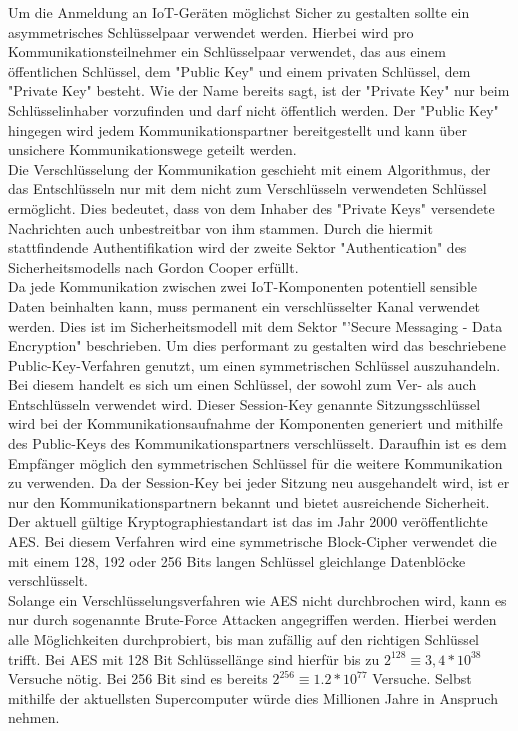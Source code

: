 Um die Anmeldung an \ac{IoT}-Geräten möglichst Sicher zu gestalten sollte ein asymmetrisches Schlüsselpaar verwendet werden. Hierbei wird pro Kommunikationsteilnehmer ein Schlüsselpaar verwendet, das aus einem öffentlichen Schlüssel, dem "Public Key" und einem privaten Schlüssel, dem "Private Key" besteht. Wie der Name bereits sagt, ist der "Private Key" nur beim Schlüsselinhaber vorzufinden und darf nicht öffentlich werden. Der "Public Key" hingegen wird jedem Kommunikationspartner bereitgestellt und kann über unsichere Kommunikationswege geteilt werden.\\

Die Verschlüsselung der Kommunikation geschieht mit einem Algorithmus, der das Entschlüsseln nur mit dem nicht zum Verschlüsseln verwendeten Schlüssel ermöglicht. Dies bedeutet, dass von dem Inhaber des "Private Keys" versendete Nachrichten auch unbestreitbar von ihm stammen. Durch die hiermit stattfindende Authentifikation wird der zweite Sektor "Authentication" des Sicherheitsmodells nach Gordon Cooper erfüllt.\\

Da jede Kommunikation zwischen zwei \ac{IoT}-Komponenten potentiell sensible Daten beinhalten kann, muss permanent ein verschlüsselter Kanal verwendet werden. Dies ist im Sicherheitsmodell mit dem Sektor "'Secure Messaging - Data Encryption" beschrieben. Um dies performant zu gestalten wird das beschriebene Public-Key-Verfahren genutzt, um einen symmetrischen Schlüssel auszuhandeln. Bei diesem handelt es sich um einen Schlüssel, der sowohl zum Ver- als auch Entschlüsseln verwendet wird. Dieser Session-Key genannte Sitzungsschlüssel wird bei der Kommunikationsaufnahme der Komponenten generiert und mithilfe des Public-Keys des Kommunikationspartners verschlüsselt. Daraufhin ist es dem Empfänger möglich den symmetrischen Schlüssel für die weitere Kommunikation zu verwenden. Da der Session-Key bei jeder Sitzung neu ausgehandelt wird, ist er nur den Kommunikationspartnern bekannt und bietet ausreichende Sicherheit.\\

Der aktuell gültige Kryptographiestandart ist das im Jahr 2000 veröffentlichte \ac{AES}. Bei diesem Verfahren wird eine symmetrische Block-Cipher verwendet die mit einem 128, 192 oder 256 Bits langen Schlüssel gleichlange Datenblöcke verschlüsselt\cite{ws:AES}.\\
Solange ein Verschlüsselungsverfahren wie \ac{AES} nicht durchbrochen wird, kann es nur durch sogenannte Brute-Force Attacken angegriffen werden. Hierbei werden alle Möglichkeiten durchprobiert, bis man zufällig auf den richtigen Schlüssel trifft. Bei \ac{AES} mit 128 Bit Schlüssellänge sind hierfür bis zu $2^{128}\equiv 3,4*10^{38}$ Versuche nötig. Bei 256 Bit sind es bereits $2^{256}\equiv 1.2*10^{77}$ Versuche. Selbst mithilfe der aktuellsten Supercomputer würde dies Millionen Jahre in Anspruch nehmen.\\

